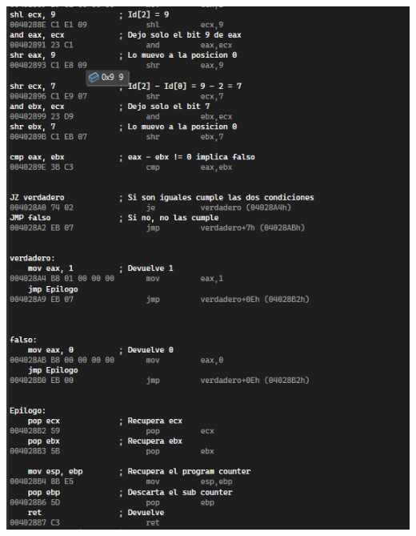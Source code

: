 \documentclass[11pt,a4paper]{article}
\begin{document}
\begin{center}
\begin{minipage}{0.49\textwidth}
      \includegraphics[width=1\textwidth]{isValidAssembly2.png}
  \end{minipage}
\end{center}
\vspace{2ex}
\end{document}
